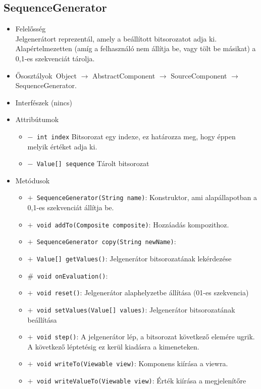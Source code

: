 \subsection{SequenceGenerator}
\begin{itemize}
\item Felelősség\\
Jelgenerátort reprezentál, amely a beállított bitsorozatot adja ki.  Alapértelmezetten (amíg a felhasználó nem állítja be, vagy tölt be másikat) a 0,1-es  szekvenciát tárolja.
\item Ősosztályok\ Object $\rightarrow{}$ AbstractComponent $\rightarrow{}$ SourceComponent $\rightarrow{}$ SequenceGenerator.
\item Interfészek (nincs)
\item Attribútumok $\ $
\begin{itemize}
	\item[] \texttt{$-$ int index} Bitsorozat egy indexe, ez határozza meg, hogy éppen melyik értéket adja ki.
	\item[] \texttt{$-$ Value[] sequence} Tárolt bitsorozat
\end{itemize}
\item Metódusok$\ $
\begin{itemize}
	\item[] \texttt{$+$ SequenceGenerator(String name)}: Konstruktor, ami alapállapotban a 0,1-es szekvenciát állítja be.
	\item[] \texttt{$+$ void addTo(Composite composite)}: Hozzáadás kompozithoz.
	\item[] \texttt{$+$ SequenceGenerator copy(String newName)}: 
	\item[] \texttt{$+$ Value[] getValues()}: Jelgenerátor bitsorozatának lekérdezése
	\item[] \texttt{$\#$ void onEvaluation()}: 
	\item[] \texttt{$+$ void reset()}: Jelgenerátor alaphelyzetbe állítása (01-es szekvencia)
	\item[] \texttt{$+$ void setValues(Value[] values)}: Jelgenerátor bitsorozatának beállítása
	\item[] \texttt{$+$ void step()}: A jelgenerátor lép, a bitsorozat következő elemére ugrik. A következő léptetésig  ez kerül kiadásra a kimeneteken.
	\item[] \texttt{$+$ void writeTo(Viewable view)}: Komponens kiírása a viewra.
	\item[] \texttt{$+$ void writeValueTo(Viewable view)}: Érték kiírása a megjelenítőre
\end{itemize}
\end{itemize}

